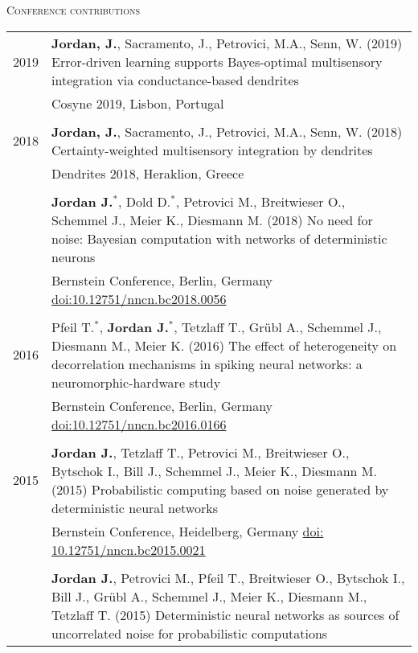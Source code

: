 \textsc{Conference contributions}
\begin{longtable}{>{\hfill}p{1.6cm} p{}}
  2019 & \textbf{Jordan, J.}, Sacramento, J., Petrovici, M.A., Senn, W. (2019) Error-driven learning supports Bayes-optimal multisensory integration via conductance-based dendrites \\
  & \footnotesize Cosyne 2019, Lisbon, Portugal \\
  \multicolumn{2}{c}{} \\
  2018 & \textbf{Jordan, J.}, Sacramento, J., Petrovici, M.A., Senn, W. (2018) Certainty-weighted multisensory integration by dendrites \\
  & \footnotesize Dendrites 2018, Heraklion, Greece \\
  \multicolumn{2}{c}{} \\
       & \textbf{Jordan J.}$^*$, Dold D.$^*$, Petrovici M., Breitwieser O., Schemmel J., Meier K., Diesmann M. (2018) No need for noise: Bayesian computation with networks of deterministic neurons \\
  & \footnotesize Bernstein Conference, Berlin, Germany \href{http://doi.org/10.12751/nncn.bc2018.0056}{doi:10.12751/nncn.bc2018.0056}\\
  \multicolumn{2}{c}{} \\
  2016 & Pfeil T.$^*$, \textbf{Jordan J.}$^*$, Tetzlaff T., Gr\"ubl A., Schemmel J., Diesmann M., Meier K. (2016) The effect of heterogeneity on decorrelation mechanisms in spiking neural networks: a neuromorphic-hardware study \\
  & \footnotesize Bernstein Conference, Berlin, Germany \href{http://dx.doi.org/10.12751/nncn.bc2016.0166}{doi:10.12751/nncn.bc2016.0166}\\
  \multicolumn{2}{c}{} \\
  2015 & \textbf{Jordan J.}, Tetzlaff T., Petrovici M., Breitwieser O., Bytschok I., Bill J., Schemmel J., Meier K., Diesmann M. (2015) Probabilistic computing based on noise generated by deterministic neural networks\\
  & \footnotesize Bernstein Conference, Heidelberg, Germany \href{http://dx.doi.org/10.12751/nncn.bc2015.0021}{doi: 10.12751/nncn.bc2015.0021}\\
 \multicolumn{2}{c}{} \\
  & \textbf{Jordan J.}, Petrovici M., Pfeil T., Breitwieser O., Bytschok I., Bill J., Gr\"ubl A., Schemmel J., Meier K., Diesmann M., Tetzlaff T. (2015) Deterministic neural networks as sources of uncorrelated noise for probabilistic computations\\

\end{longtable}
